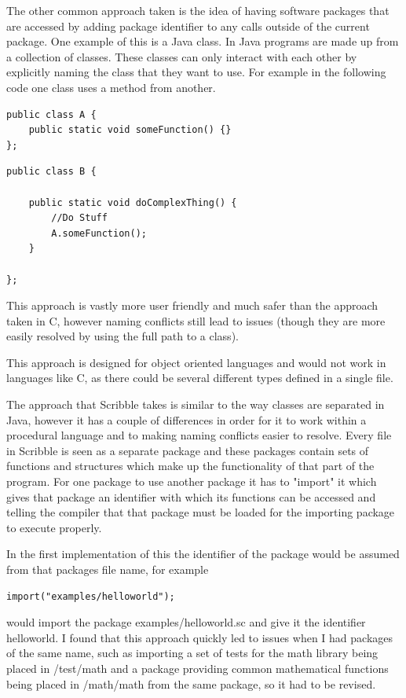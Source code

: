 \documentclass[]{final_report}
\begin{document}
The other common approach taken is the idea of having software packages that are accessed by adding  package identifier to any calls outside of the current package. One example of this is a Java class. In Java programs are made up from a collection of classes. These classes can only interact with each other by explicitly naming the class that they want to use. For example in the following code one class uses a method from another.

\begin{verbatim}
public class A {
    public static void someFunction() {}
};
\end{verbatim}

\begin{verbatim}
public class B {

    public static void doComplexThing() {
        //Do Stuff
        A.someFunction();
    }

};
\end{verbatim}

This approach is vastly more user friendly and much safer than the approach taken in C, however naming conflicts still lead to issues (though they are more easily resolved by using the full path to a class).

This approach is designed for object oriented languages and would not work in languages like C, as there could be several different types defined in a single file.

The approach that Scribble takes is similar to the way classes are separated in Java, however it has a couple of differences in order for it to work within a procedural language and to making naming conflicts easier to resolve. Every file in Scribble is seen as a separate package and these packages contain sets of functions and structures which make up the functionality of that part of the program. For one package to use another package it has to "import" it which gives that package an identifier with which its functions can be accessed and telling the compiler that that package must be loaded for the importing package to execute properly.

In the first implementation of this the identifier of the package would be assumed from that packages file name, for example \begin{verbatim}import("examples/helloworld");\end{verbatim} would import the package examples/helloworld.sc and give it the identifier helloworld. I found that this approach quickly led to issues when I had packages of the same name, such as importing a set of tests for the math library being placed in /test/math and a package providing common mathematical functions being placed in /math/math from the same package, so it had to be revised.
\end{document}
